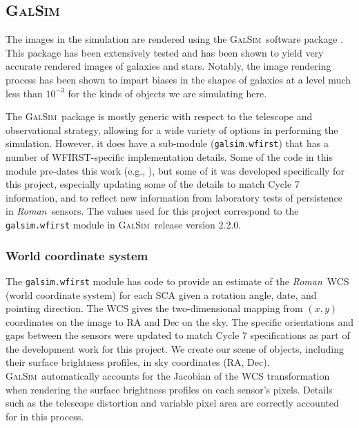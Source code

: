 \documentclass[usenatbib]{mnras}
\newcommand{\galsim}{\textsc{GalSim}}
\newcommand{\wfirst}{{\slshape Roman}}
\begin{document}
\subsection{\galsim}

The images in the simulation are rendered using the \galsim\ software package \citep{Rowe15}.  
This package has been extensively tested and has been shown to yield very accurate rendered images of galaxies and stars.
Notably, the image rendering process has been shown to impart biases in the shapes of galaxies at a level much less than $10^{-3}$ for the kinds of objects we are simulating here.  

The \galsim\ package is mostly generic with respect to the telescope and observational strategy, allowing for a wide variety of options in performing the simulation.
However, it does have a sub-module (\texttt{galsim.wfirst}) that has a number of WFIRST-specific implementation details.
Some of the code in this module pre-dates this work (e.g., \cite{2016PASP..128i5001K}), but some of it was developed specifically for this project, especially updating some of the details to match Cycle 7 information, and to reflect new information from laboratory tests of persistence in \wfirst\ sensors.  
The values used for this project correspond to the \texttt{galsim.wfirst} module in \galsim\ release version 2.2.0.

\subsubsection{World coordinate system}\label{wcs}

The \texttt{galsim.wfirst} module has code to provide an estimate of the \wfirst\ WCS (world coordinate system) for each SCA given a rotation angle, date, and pointing direction.  
The WCS gives the two-dimensional mapping from $(x,y)$ coordinates on the image to RA and Dec on the sky.
The specific orientations and gaps between the sensors were updated to match Cycle 7 specifications as part of the development work for this project.
We create our scene of objects, including their surface brightness profiles, in sky coordinates (RA, Dec).
\galsim\ automatically accounts for the Jacobian of the WCS transformation when rendering the surface brightness profiles on each sensor's pixels.  
Details such as the telescope distortion and variable pixel area are correctly accounted for in this process.
\end{document}
